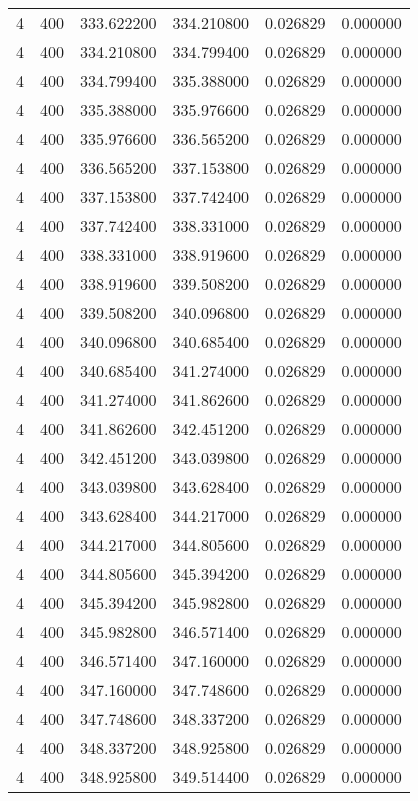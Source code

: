 \begin{longtable}{rrrrrr}
4 & 400 & 333.622200 & 334.210800 & 0.026829 & 0.000000 \\
4 & 400 & 334.210800 & 334.799400 & 0.026829 & 0.000000 \\
4 & 400 & 334.799400 & 335.388000 & 0.026829 & 0.000000 \\
4 & 400 & 335.388000 & 335.976600 & 0.026829 & 0.000000 \\
4 & 400 & 335.976600 & 336.565200 & 0.026829 & 0.000000 \\
4 & 400 & 336.565200 & 337.153800 & 0.026829 & 0.000000 \\
4 & 400 & 337.153800 & 337.742400 & 0.026829 & 0.000000 \\
4 & 400 & 337.742400 & 338.331000 & 0.026829 & 0.000000 \\
4 & 400 & 338.331000 & 338.919600 & 0.026829 & 0.000000 \\
4 & 400 & 338.919600 & 339.508200 & 0.026829 & 0.000000 \\
4 & 400 & 339.508200 & 340.096800 & 0.026829 & 0.000000 \\
4 & 400 & 340.096800 & 340.685400 & 0.026829 & 0.000000 \\
4 & 400 & 340.685400 & 341.274000 & 0.026829 & 0.000000 \\
4 & 400 & 341.274000 & 341.862600 & 0.026829 & 0.000000 \\
4 & 400 & 341.862600 & 342.451200 & 0.026829 & 0.000000 \\
4 & 400 & 342.451200 & 343.039800 & 0.026829 & 0.000000 \\
4 & 400 & 343.039800 & 343.628400 & 0.026829 & 0.000000 \\
4 & 400 & 343.628400 & 344.217000 & 0.026829 & 0.000000 \\
4 & 400 & 344.217000 & 344.805600 & 0.026829 & 0.000000 \\
4 & 400 & 344.805600 & 345.394200 & 0.026829 & 0.000000 \\
4 & 400 & 345.394200 & 345.982800 & 0.026829 & 0.000000 \\
4 & 400 & 345.982800 & 346.571400 & 0.026829 & 0.000000 \\
4 & 400 & 346.571400 & 347.160000 & 0.026829 & 0.000000 \\
4 & 400 & 347.160000 & 347.748600 & 0.026829 & 0.000000 \\
4 & 400 & 347.748600 & 348.337200 & 0.026829 & 0.000000 \\
4 & 400 & 348.337200 & 348.925800 & 0.026829 & 0.000000 \\
4 & 400 & 348.925800 & 349.514400 & 0.026829 & 0.000000 \\

\end{longtable}
